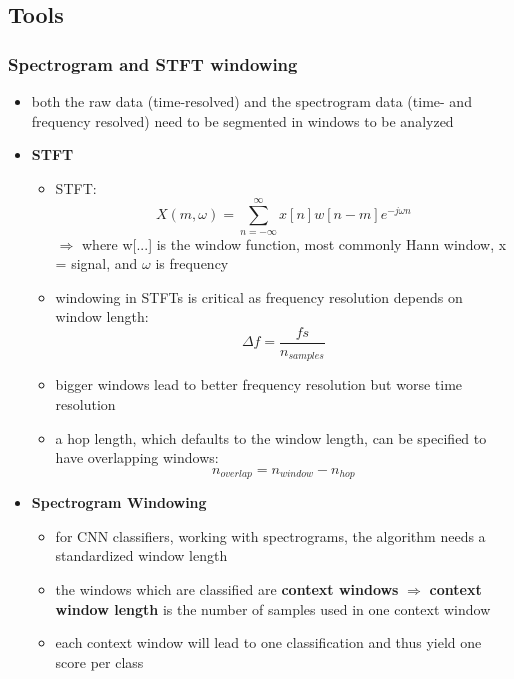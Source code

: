 \documentclass[12pt,a4paper]{article}
\begin{document}
\subsection{Tools} %
\label{sub:tools}


\subsubsection{Spectrogram and STFT windowing} %
\label{ssub:spectrogram_and_stft_windowing}
\begin{itemize}
  \item both the raw data (time-resolved) and the spectrogram data (time- and frequency resolved) need to be segmented in windows to be analyzed
  \item \textbf{STFT}
  \begin{itemize}
    \item STFT:
    \begin{equation}
      X(m, \omega) = \sum_{n=-\infty}^\infty x[n]w[n-m]e^{-j\omega n}
    \end{equation}
    $\Longrightarrow$ where w[...] is the window function, most commonly Hann window, x = signal, and $\omega$ is frequency
    \item windowing in STFTs is critical as frequency resolution depends on window length:
    \begin{equation}
      \Delta f = \frac{fs}{n_{samples}}
    \end{equation}
    \item bigger windows lead to better frequency resolution but worse time resolution
    \item a hop length, which defaults to the window length, can be specified to have overlapping windows:
    \begin{equation}
        n_{overlap} = n_{window} - n_{hop}
    \end{equation}
  \end{itemize}
  \item \textbf{Spectrogram Windowing}
  \begin{itemize}
    \item for CNN classifiers, working with spectrograms, the algorithm needs a standardized window length
    \item the windows which are classified are \textbf{context windows} $\Longrightarrow$ \textbf{context window length} is the number of samples used in one context window
    \item each context window will lead to one classification and thus yield one score per class

\end{itemize}
\end{itemize}
\end{document}
